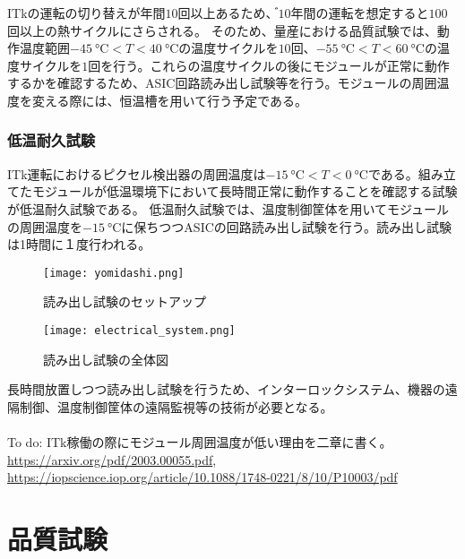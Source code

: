 ITkの運転の切り替えが年間$10$回以上あるため、゙$10$年間の運転を想定すると$100$回以上の熱サイクルにさらされる。
そのため、量産における品質試験では、動作温度範囲$-45\ \si{\degreeCelsius}<T<40\ \si{\degreeCelsius}$の温度サイクルを$10$回、$-55\ \si{\degreeCelsius}<T<60\ \si{\degreeCelsius}$の温度サイクルを$1$回を行う。これらの温度サイクルの後にモジュールが正常に動作するかを確認するため、ASIC回路読み出し試験等を行う。モジュールの周囲温度を変える際には、恒温槽を用いて行う予定である。

\subsubsection*{低温耐久試験}

ITk運転におけるピクセル検出器の周囲温度は$-15\ \si{\degreeCelsius}<T<0\ \si{\degreeCelsius}$である。組み立てたモジュールが低温環境下において長時間正常に動作することを確認する試験が低温耐久試験である。
低温耐久試験では、温度制御筐体を用いてモジュールの周囲温度を$-15\ \si{\degreeCelsius}$に保ちつつASICの回路読み出し試験を行う。読み出し試験は1時間に１度行われる。
\begin{figure}[tbp]
  \centering
  \texttt{[image: yomidashi.png]}
  \caption[読み出し試験のセットアップ]{読み出し試験のセットアップ \cite{studyofID} }
  \label{fig:yomidashi}
\end{figure}
\begin{figure}[tbp]
  \centering
  \texttt{[image: electrical\_system.png]}
  \caption[読み出し試験の全体図]{読み出し試験の全体図 \cite{studyofID} }
  \label{fig:electrical-system}
\end{figure}

長時間放置しつつ読み出し試験を行うため、インターロックシステム、機器の遠隔制御、温度制御筐体の遠隔監視等の技術が必要となる。
\\
\\
To do: ITk稼働の際にモジュール周囲温度が低い理由を二章に書く。\\
\url{https://arxiv.org/pdf/2003.00055.pdf}, \\
\url{https://iopscience.iop.org/article/10.1088/1748-0221/8/10/P10003/pdf}
\\




\section{品質試験}
\label{sec:QCtest}

